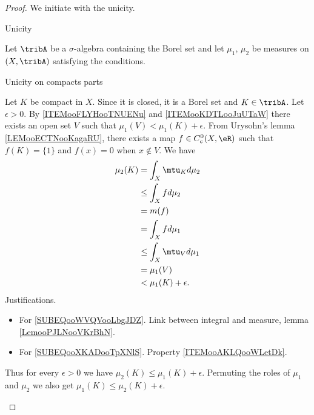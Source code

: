 \begin{proof}
    We initiate with the unicity.
    \begin{center}
        Unicity
    \end{center}
    Let \( \tribA\) be a \( \sigma\)-algebra containing the Borel set and let \( \mu_1\), \( \mu_2\) be measures on \( (X,\tribA)\) satisfying the conditions.
    \begin{subproof}
    \item[Unicity on compacts parts]

    Let \( K\) be compact in \( X\). Since it is closed, it is a Borel set and \( K\in \tribA\). Let \( \epsilon>0\). By \ref{ITEMooFLYHooTNUENu} and \ref{ITEMooKDTLooJuUTaW} there exists an open set \( V\) such that \( \mu_1(V)<\mu_1(K)+\epsilon\). From Urysohn's lemma \ref{LEMooECTNooKagaRU}, there exists a map \( f\in C^0_c(X,\eR)\) such that \( f(K)=\{ 1 \}\) and \( f(x)=0\) when \( x\notin V\). We have
    \begin{subequations}
        \begin{align}
            \mu_2(K)&=\int_X\mtu_Kd\mu_2        \label{SUBEQooWVQVooLbgJDZ}\\
            &\leq \int_Xfd\mu_2\\
            &=m(f)                  \label{SUBEQooXKADooTpXNlS}\\
            &= \int_Xfd\mu_1\\
            &\leq \int_X\mtu_{V}d\mu_1\\
            &=\mu_1(V)\\
            &<\mu_1(K)+\epsilon.
        \end{align}
    \end{subequations}
    Justifications.
    \begin{itemize}
        \item For \eqref{SUBEQooWVQVooLbgJDZ}. Link between integral and measure, lemma \ref{LemooPJLNooVKrBhN}.
        \item For \eqref{SUBEQooXKADooTpXNlS}. Property \ref{ITEMooAKLQooWLetDk}.
    \end{itemize}
    Thus for every \( \epsilon>0\) we have \( \mu_2(K)\leq \mu_1(K)+\epsilon\). Permuting the roles of \( \mu_1\) and \( \mu_2\) we also get \( \mu_1(K)\leq \mu_2(K)+\epsilon\).


\end{subproof}
\end{proof}
